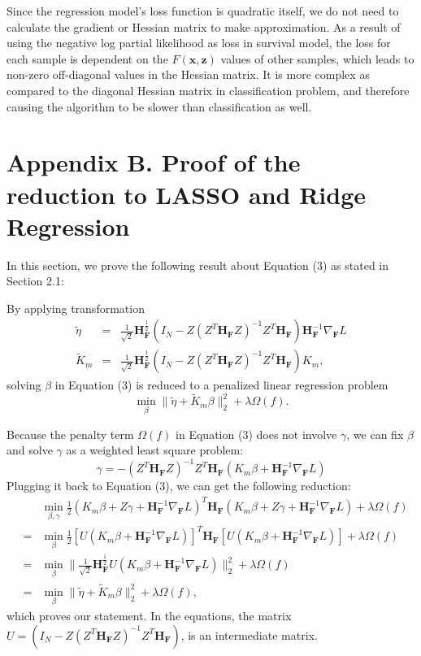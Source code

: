 \documentclass[a4paper,12pt]{article}
\newcommand{\bd}[1]{\mathbf{#1}}
\newcommand{\grad}[2]{\nabla_{\bd{#2}} #1}
\newcommand{\hess}[1]{\bd{H}_{\bd{#1}}}
\begin{document}
	
	Since the regression model's loss function is quadratic itself, we do not need to calculate the gradient or Hessian matrix to make approximation. As a result of using the negative log partial likelihood as loss in survival model, the loss for each sample is dependent on the $F(\bd{x}, \bd{z})$ values of other samples, which leads to non-zero off-diagonal values in the Hessian matrix. It is more complex as compared to the diagonal Hessian matrix in classification problem, and therefore causing the algorithm to be slower than classification as well.
	\newpage
	\section*{Appendix B. Proof of the reduction to LASSO and Ridge Regression} \label{sec:proof}
	In this section, we prove the following result about Equation (3) as stated in Section 2.1:
	
	By applying transformation
	\begin{eqnarray*}
		\tilde{\eta} &=& \frac{1}{\sqrt{2}}\hess{F}^{\frac{1}{2}}(I_N - Z(Z^T \hess{F} Z)^{-1}Z^T \hess{F})\hess{F}^{-1}\grad{L}{F}\\
		\tilde{K}_m &=& \frac{1}{\sqrt{2}}\hess{F}^{\frac{1}{2}}(I_N - Z(Z^T\hess{F}Z)^{-1}Z^T\hess{F})K_m,
	\end{eqnarray*}
	solving $\beta$ in Equation (3) is reduced to a penalized linear regression problem
	\begin{equation*}
	\min_{\beta} \|\tilde{\eta} + \tilde{K}_m \beta \|_2^2 + \lambda \Omega(f).
	\end{equation*}
	
	Because the penalty term $\Omega(f)$ in Equation (3) does not involve $\gamma$, we can fix $\beta$ and solve $\gamma$ as a weighted least square problem:
	$$\gamma = -(Z^T\hess{F}Z)^{-1}Z^T\hess{F}(K_m\beta + \hess{F}^{-1}\grad{L}{F})$$
	Plugging it back to Equation (3), we can get the following reduction:
	\begin{eqnarray*}
		& & \min_{\beta, \gamma} \frac{1}{2} (K_m \beta + Z \gamma + \hess{F}^{-1} \grad{L}{F})^T \hess{F} (K_m \beta + Z \gamma + \hess{F}^{-1} \grad{L}{F}) + \lambda \Omega(f) \\
		& = & \min_{\beta} \frac{1}{2} [ U(K_m \beta + \hess{F}^{-1} \grad{L}{F}) ]^T \hess{F} [ U (K_m \beta + \hess{F}^{-1} \grad{L}{F}) ]  + \lambda \Omega(f) \\
		& = & \min_{\beta}  \| \frac{1}{\sqrt{2}}\hess{F}^{\frac{1}{2}}U(K_m \beta + \hess{F}^{-1} \grad{L}{F}) \|_2^2+ \lambda \Omega(f) \\
		&=& \min_{\beta} \|\tilde{\eta} + \tilde{K}_m \beta \|_2^2 + \lambda \Omega(f), 
	\end{eqnarray*}
	which proves our statement. In the equations, the matrix $U = (I_N -Z(Z^T\hess{F}Z)^{-1}Z^T\hess{F})$, is an intermediate matrix.
	
\end{document}
